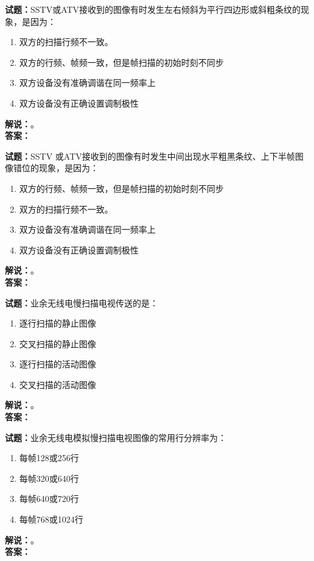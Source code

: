 \documentclass{ctexbook}
\begin{document}
\bigskip




\noindent\textbf{试题：}SSTV或ATV接收到的图像有时发生左右倾斜为平行四边形或斜粗条纹的现象，是因为：
\begin{enumerate}[leftmargin=3em]
\item 双方的扫描行频不一致。
\item 双方的行频、帧频一致，但是帧扫描的初始时刻不同步
\item 双方设备没有准确调谐在同一频率上
\item 双方设备没有正确设置调制极性
\end{enumerate}
\noindent\textbf{解说：}\textbf{}。\\\noindent\textbf{答案：}

\bigskip




\noindent\textbf{试题：}SSTV 或ATV接收到的图像有时发生中间出现水平粗黑条纹、上下半帧图像错位的现象，是因为：
\begin{enumerate}[leftmargin=3em]
\item 双方的行频、帧频一致，但是帧扫描的初始时刻不同步
\item 双方的扫描行频不一致。
\item 双方设备没有准确调谐在同一频率上
\item 双方设备没有正确设置调制极性
\end{enumerate}
\noindent\textbf{解说：}\textbf{}。\\\noindent\textbf{答案：}

\bigskip




\noindent\textbf{试题：}业余无线电慢扫描电视传送的是：
\begin{enumerate}[leftmargin=3em]
\item 逐行扫描的静止图像
\item 交叉扫描的静止图像
\item 逐行扫描的活动图像
\item 交叉扫描的活动图像
\end{enumerate}
\noindent\textbf{解说：}\textbf{}。\\\noindent\textbf{答案：}

\bigskip




\noindent\textbf{试题：}业余无线电模拟慢扫描电视图像的常用行分辨率为：
\begin{enumerate}[leftmargin=3em]
\item 每帧128或256行
\item 每帧320或640行
\item 每帧640或720行
\item 每帧768或1024行
\end{enumerate}
\noindent\textbf{解说：}\textbf{}。\\\noindent\textbf{答案：}
\end{document}
